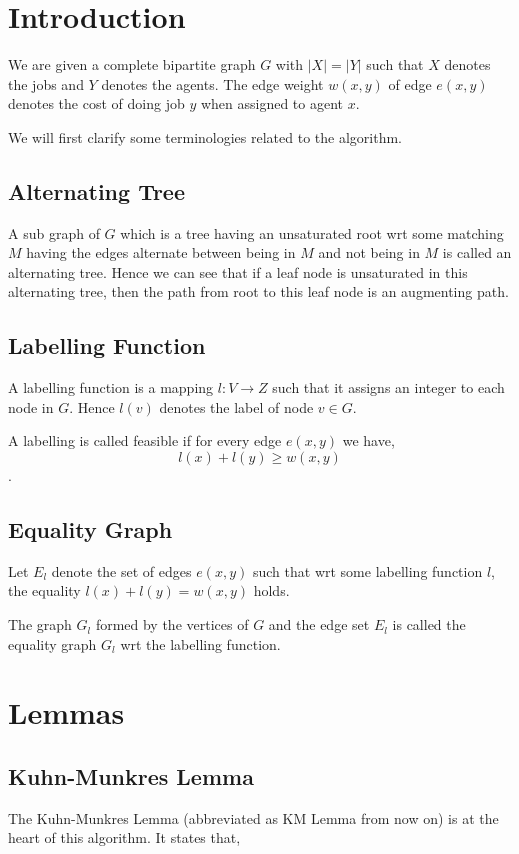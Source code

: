 \documentclass{article}
\begin{document}
\section{Introduction}
We are given a complete bipartite graph $G$ with $|X|=|Y|$ such that $X$ denotes the jobs and $Y$ denotes the agents. The edge weight $w(x, y)$ of edge $e(x, y)$ denotes the cost of doing job $y$ when assigned to agent $x$.

We will first clarify some terminologies related to the algorithm.

\subsection{Alternating Tree}
A sub graph of $G$ which is a tree having an unsaturated root wrt some matching $M$ having the edges alternate between being in $M$ and not being in $M$ is called an alternating tree. Hence we can see that if a leaf node is unsaturated in this alternating tree, then the path from root to this leaf node is an augmenting path.

\subsection{Labelling Function}
A labelling function is a mapping $l: V \to Z$ such that it assigns an integer to each node in $G$. Hence $l(v)$ denotes the label of node $v \in G$.

A labelling is called feasible if for every edge $e(x, y)$ we have,
$$l(x)+l(y) \geq w(x, y)$$.

\subsection{Equality Graph}
Let $E_l$ denote the set of edges $e(x, y)$ such that wrt some labelling function $l$, the equality $l(x)+l(y) = w(x, y)$ holds.

The graph $G_l$ formed by the vertices of $G$ and the edge set $E_l$ is called the equality graph $G_l$ wrt the labelling function.

\section{Lemmas}

\subsection{Kuhn-Munkres Lemma}
The Kuhn-Munkres Lemma (abbreviated as KM Lemma from now on) is at the heart of this algorithm. It states that,
\end{document}
